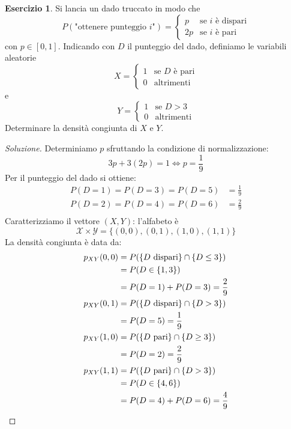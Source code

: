 \documentclass{article}
\theoremstyle{plain}
\theoremstyle{definition}
\newtheorem{esercizio}{Esercizio}[section]
\theoremstyle{remark}
\newenvironment{soluzione}
	{\renewcommand\qedsymbol{$\mathwitch*$}\begin{proof}[Soluzione]}
	{\end{proof}}
\renewcommand{\qedsymbol}{$\mathrightghost$}
\begin{document}
\begin{esercizio}
	Si lancia un dado truccato in modo che
	\begin{equation*}
		P(\text{"ottenere punteggio }i\text{"})=
		\begin{cases}
			p&\text{se }i\text{ è dispari}\\
			2p&\text{se }i\text{ è pari}
		\end{cases}
	\end{equation*}
	con $p\in[0,1]$. Indicando con $D$ il punteggio del dado, definiamo le variabili aleatorie
	\begin{equation*}
		X=
		\begin{cases}
			1&\text{se }D\text{ è pari}\\
			0&\text{altrimenti}
		\end{cases}
	\end{equation*}
	e 
	\begin{equation*}
		Y=
		\begin{cases}
			1&\text{se }D>3\\
			0&\text{altrimenti}
		\end{cases}
	\end{equation*}
	Determinare la densità congiunta di $X$ e $Y$.
	\begin{soluzione}
		Determiniamo $p$ sfruttando la condizione di normalizzazione:
		\begin{equation*}
			3p+3(2p)=1\Leftrightarrow p=\frac{1}{9}
		\end{equation*}
		Per il punteggio del dado si ottiene:
		\begin{align*}
			P(D=1)=P(D=3)=P(D=5)&=\frac{1}{9}\\
			P(D=2)=P(D=4)=P(D=6)&=\frac{2}{9}\\
		\end{align*}
		Caratterizziamo il vettore $(X,Y)$: l'alfabeto è
		\begin{equation*}
			\mathcal{X}\times\mathcal{Y}=\{(0,0),(0,1),(1,0),(1,1)\}
		\end{equation*}
		La densità congiunta è data da:
		\begin{align*}
			p_{XY}(0,0)&=P(\{D\text{ dispari}\}\cap \{D\leq3\})\\
			&=P(D\in\{1,3\})\\
			&=P(D=1)+P(D=3)=\frac{2}{9}\\
			p_{XY}(0,1)&=P(\{D\text{ dispari}\}\cap \{D>3\})\\
			&=P(D=5)=\frac{1}{9}\\
			p_{XY}(1,0)&=P(\{D\text{ pari}\}\cap \{D\geq3\})\\
			&=P(D=2)=\frac{2}{9}\\
			p_{XY}(1,1)&=P(\{D\text{ pari}\}\cap \{D>3\})\\
			&=P(D\in\{4,6\})\\
			&=P(D=4)+P(D=6)=\frac{4}{9}\qedhere
		\end{align*}
	\end{soluzione}
\end{esercizio}
\end{document}
